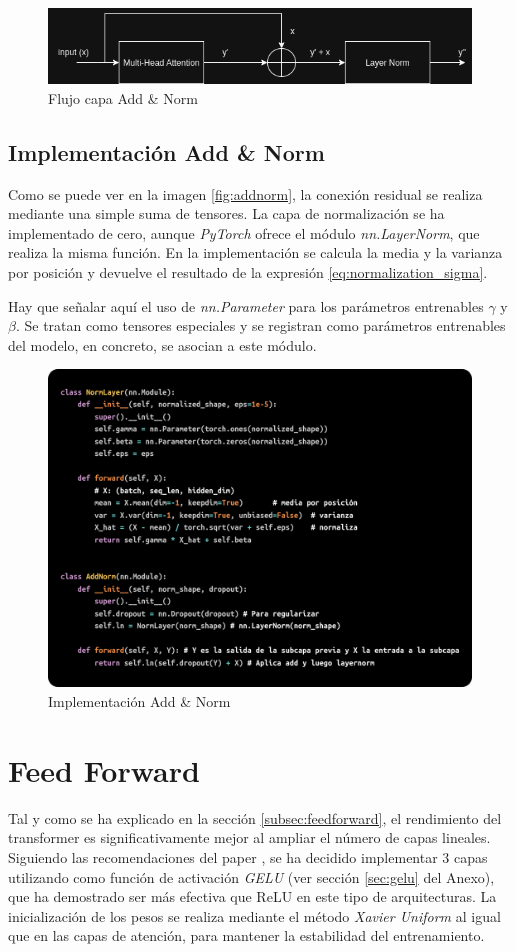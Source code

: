 \documentclass[11pt]{book}
\theoremstyle{plain}
\theoremstyle{definition}
\begin{document}
\begin{figure}[h]
    \centering
    \includegraphics[width=0.5\linewidth]{img/esquema1.png}
    \caption{Flujo capa Add \& Norm}
    \label{fig:placeholder14}
\end{figure}

\subsection{Implementación Add \& Norm}

Como se puede ver en la imagen \ref{fig:addnorm}, la conexión residual se realiza mediante una simple suma de tensores. La capa de normalización se ha implementado de cero, aunque \textit{PyTorch} ofrece el módulo \textit{nn.LayerNorm}, que realiza la misma función. En la implementación se calcula la media y la varianza por posición y devuelve el resultado de la expresión \eqref{eq:normalization_sigma}. 

Hay que señalar aquí el uso de \textit{nn.Parameter} para los parámetros entrenables $\gamma$ y $\beta$. Se tratan como tensores especiales y se registran como parámetros entrenables del modelo, en concreto, se asocian a este módulo. 

\begin{figure}[h]
    \centering
    \includegraphics[width=0.5\linewidth]{img/add_norm.png}
    \caption{Implementación Add \& Norm}
    \label{fig:placeholder9}
\end{figure}

\section{Feed Forward} 
Tal y como se ha explicado en la sección \ref{subsec:feedforward}, el rendimiento del transformer es significativamente mejor al ampliar el número de capas lineales. Siguiendo las recomendaciones del paper \parencite{gerber2025ffn}, se ha decidido implementar 3 capas utilizando como función de activación \textit{GELU} (ver sección \ref{sec:gelu} del Anexo), que ha demostrado ser más efectiva que ReLU en este tipo de arquitecturas. La inicialización de los pesos se realiza mediante el método \textit{Xavier Uniform} al igual que en las capas de atención, para mantener la estabilidad del entrenamiento.
\end{document}
